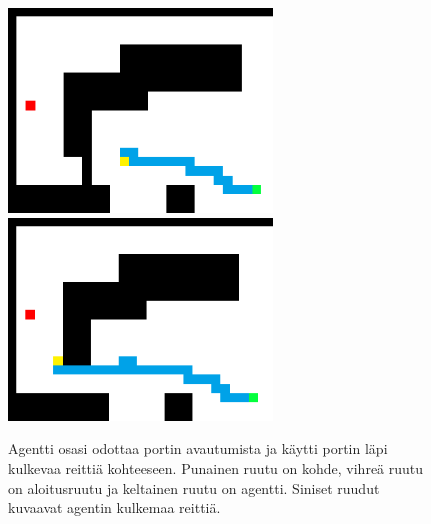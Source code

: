 \documentclass[utf8]{gradu3}
\begin{document}
\begin{figure}[h]
\includegraphics[width=7cm]{agent_avoid_gate.png}
\hspace{1 cm}
\includegraphics[width=7cm]{agent_through_gate.png}
\caption{Agentti osasi odottaa portin avautumista ja käytti portin läpi kulkevaa reittiä kohteeseen. Punainen ruutu on kohde, vihreä ruutu on aloitusruutu ja keltainen ruutu on agentti. Siniset ruudut kuvaavat agentin kulkemaa reittiä.}
\label{agentgate}
\end{figure}
\end{document}
